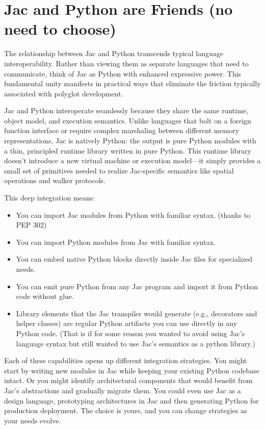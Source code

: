 \section{Jac and Python are Friends (no need to choose)}

The relationship between Jac and Python transcends typical language interoperability. Rather than viewing them as separate languages that need to communicate, think of Jac as Python with enhanced expressive power. This fundamental unity manifests in practical ways that eliminate the friction typically associated with polyglot development.

Jac and Python interoperate seamlessly because they share the same runtime, object model, and execution semantics. Unlike languages that bolt on a foreign function interface or require complex marshaling between different memory representations, Jac is natively Python: the output is pure Python modules with a thin, principled runtime library written in pure Python. This runtime library doesn't introduce a new virtual machine or execution model—it simply provides a small set of primitives needed to realize Jac-specific semantics like spatial operations and walker protocols.

This deep integration means:

\begin{itemize}
    \item You can import Jac modules from Python with familiar syntax. (thanks to PEP 302)
    \item You can import Python modules from Jac with familiar syntax.
    \item You can embed native Python blocks directly inside Jac files for specialized needs.
    \item You can emit pure Python from any Jac program and import it from Python code without glue.
    \item Library elements that the Jac transpiler would generate (e.g., decorators and helper classes) are regular Python artifacts you can use directly in any Python code. (That is if for some reason you wanted to avoid using Jac's language syntax but still wanted to use Jac's semantics as a python library.)
\end{itemize}

Each of these capabilities opens up different integration strategies. You might start by writing new modules in Jac while keeping your existing Python codebase intact. Or you might identify architectural components that would benefit from Jac's abstractions and gradually migrate them. You could even use Jac as a design language, prototyping architectures in Jac and then generating Python for production deployment. The choice is yours, and you can change strategies as your needs evolve.

